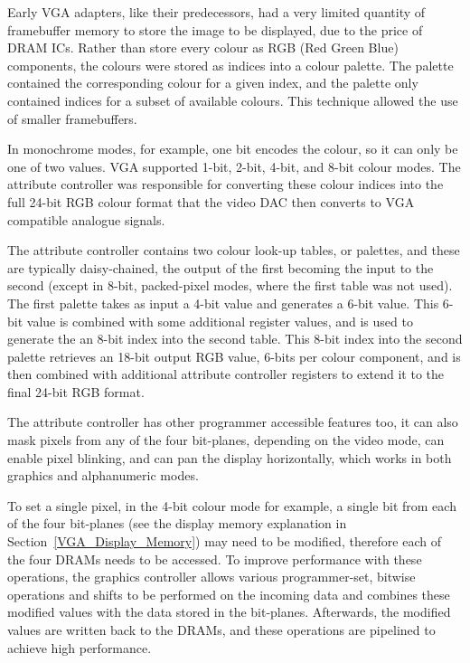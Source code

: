 Early VGA adapters, like their predecessors, had a very limited quantity of
framebuffer memory to store the image to be displayed, due to the price of DRAM
ICs. Rather than store every colour as RGB (Red Green Blue) components, the colours were stored as indices into
a colour palette. The palette contained the corresponding colour for a given
index, and the palette only contained indices for a subset of available colours.
This technique allowed the use of smaller framebuffers.

In monochrome modes, for example, one bit encodes the colour, so it can only be
one of two values. VGA supported 1-bit, 2-bit, 4-bit, and 8-bit colour modes. The
attribute controller was responsible for converting these colour indices into the
full 24-bit RGB colour format that the video DAC then converts to VGA compatible
analogue signals.

The attribute controller contains two colour look-up tables, or palettes, and
these are typically daisy-chained, the output of the first becoming the input to
the second (except in 8-bit, packed-pixel modes, where the first table was not
used). The first palette takes as input a 4-bit value and generates a 6-bit
value. This 6-bit value is combined with some additional register values, and is
used to generate the an 8-bit index into the second table. This 8-bit index into
the second palette retrieves an 18-bit output RGB value, 6-bits per colour
component, and is then combined with additional attribute controller registers to
extend it to the final 24-bit RGB format.

The attribute controller has other programmer accessible features too, it can
also mask pixels from any of the four bit-planes, depending on the video mode, can
enable pixel blinking, and can pan the display horizontally, which works in both
graphics and alphanumeric modes.

To set a single pixel, in the 4-bit colour mode for example, a single bit from
each of the four bit-planes (see the display memory explanation in
Section~\ref{VGA_Display_Memory}) may need to be modified, therefore each of the
four DRAMs needs to be accessed. To improve performance with these operations,
the graphics controller allows various programmer-set, bitwise operations and
shifts to be performed on the incoming data and combines these modified values
with the data stored in the bit-planes. Afterwards, the modified values are
written back to the DRAMs, and these operations are pipelined to achieve high
performance.

